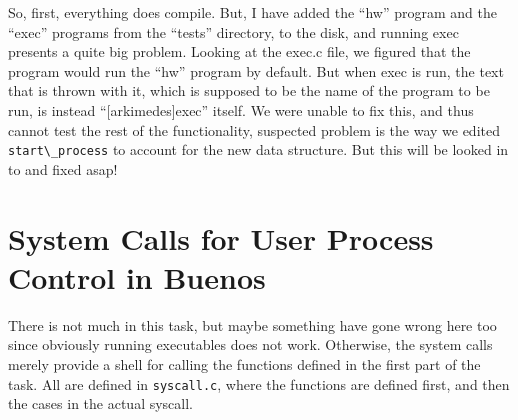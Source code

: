 So, first, everything does compile. But, I have added the ``hw'' program
and the ``exec'' programs from the ``tests'' directory, to the disk,
and running exec presents a quite big problem. Looking at the exec.c
file, we figured that the program would run the ``hw'' program by
default. But when exec is run, the text that is thrown with it, which
is supposed to be the name of the program to be run, is instead
``[arkimedes]exec'' itself. We were unable to fix this, and thus
cannot test the rest of the functionality, suspected problem is the
way we edited \verb+start\_process+ to account for the new data
structure. But this will be looked in to and fixed asap!

\vspace{1pc}

\section*{System Calls for User Process Control in Buenos}

There is not much in this task, but maybe something have gone wrong
here too since obviously running executables does not work. Otherwise,
the system calls merely provide a shell for calling the functions
defined in the first part of the task. All are defined in
\verb+syscall.c+, where the functions are defined first, and then
the cases in the actual syscall.


%



